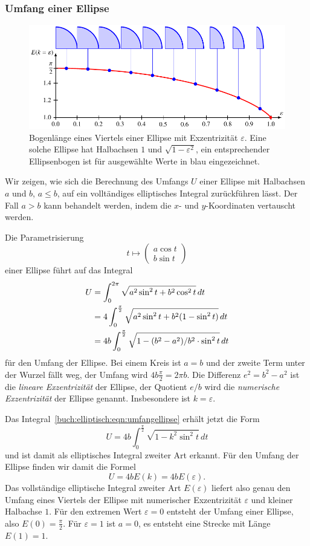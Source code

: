 \subsubsection{Umfang einer Ellipse}
\begin{figure}
\centering
\includegraphics{chapters/110-elliptisch/images/ellipsenumfang.pdf}
\caption{Bogenlänge eines Viertels einer Ellipse mit Exzentrizität
$\varepsilon$.
Eine solche Ellipse hat Halbachsen $1$ und $\sqrt{1-\varepsilon^2}$,
ein entsprechender Ellipsenbogen ist für ausgewählte Werte in blau
eingezeichnet.
\label{buch:elliptisch:fig:ellipsenumfang}}
\end{figure}
Wir zeigen, wie sich die Berechnung des Umfangs $U$ einer Ellipse
mit Halbachsen $a$ und $b$, $a\le b$, auf ein volltändiges elliptisches
Integral zurückführen lässt.
Der Fall $a>b$ kann behandelt werden, indem die $x$- und $y$-Koordinaten
vertauscht werden.

Die Parametrisierung
\[
t\mapsto \begin{pmatrix}a\cos t\\ b\sin t\end{pmatrix}
\]
einer Ellipse führt auf das Integral
\begin{align}
U
&=
\int_0^{2\pi} \sqrt{a^2\sin^2t + b^2\cos^2 t}\,dt
\notag
\\
&=
4\int_0^{\frac{\pi}2}
\sqrt{a^2\sin^2t + b^2(1-\sin^2 t)}
\,dt
\notag
\\
&=
4b \int_0^{\frac{\pi}2} \sqrt{1-(b^2-a^2)/b^2\cdot \sin^2t}\,dt
\label{buch:elliptisch:eqn:umfangellipse}
\end{align}
für den Umfang der Ellipse.
Bei einem Kreis ist $a=b$ und der zweite Term unter der Wurzel fällt weg,
der Umfang wird $4b\frac{\pi}2=2\pi b$.
Die Differenz $e^2=b^2-a^2$ ist die {\em lineare Exzentrizität} der Ellipse,
%
der Quotient $e/b$ wird die {\em numerische Exzentrizität} der Ellipse
genannt.
Insbesondere ist $k = \varepsilon$.

Das Integral~\eqref{buch:elliptisch:eqn:umfangellipse} erhält jetzt die
Form
\[
U
=
4b\int_0^{\frac{\pi}2} \sqrt{1-k^2\sin^2t}\,dt
\]
und ist damit als elliptisches Integral zweiter Art erkannt.
Für den Umfang der Ellipse finden wir damit die Formel
\[
U
=
4b E(k)
=
4b E(\varepsilon).
\]
Das vollständige elliptische Integral zweiter Art $E(\varepsilon)$
liefert also genau den Umfang eines Viertels der Ellipse mit
numerischer Exzentrizität $\varepsilon$ und kleiner Halbachse $1$.
Für den extremen Wert $\varepsilon=0$ entsteht der Umfang einer Ellipse,
also $E(0)=\frac{\pi}2$.
Für $\varepsilon=1$ ist $a=0$, es entsteht eine Strecke mit Länge $E(1)=1$.

